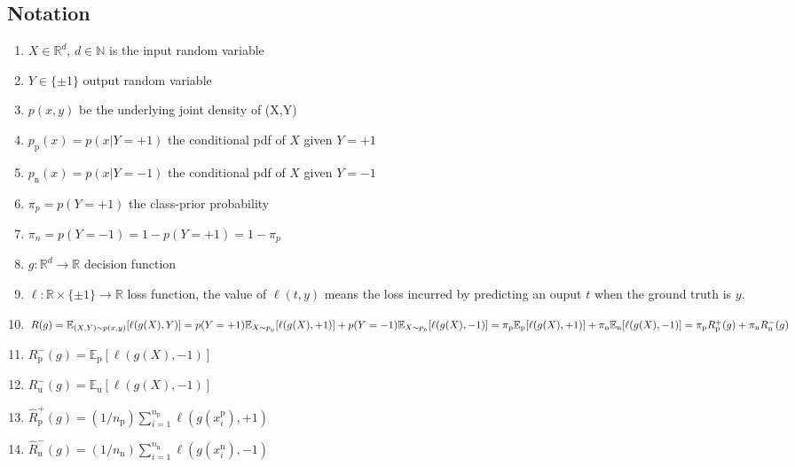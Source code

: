 \documentclass[12pt]{article}
\theoremstyle{definition}
\begin{document}
\subsection{Notation}
 \begin{enumerate}
	\item $X \in \mathbb{R}^{d}$, $d\in \mathbb{N}$ is the input random variable
	\item $ Y \in \{\pm 1\}$ output random variable
	\item $p(x,y)$ be the underlying joint density of (X,Y)
	\item $p_{\mathrm{p}}(x)=p(x | Y=+1)$ the conditional pdf of $X$ given $Y = +1$ 
	\item $p_{\mathrm{n}}(x)=p(x | Y=-1)$ the conditional pdf of $X$ given $Y = -1$ 
	\item $\pi_p = p(Y = +1)$ the class-prior probability
	\item $\pi_n = p(Y = -1) = 1 - p(Y = +1) = 1-\pi_p$
	\item $g: \mathbb{R}^{d} \rightarrow \mathbb{R}$ decision function
	\item $\ell: \mathbb{R} \times\{\pm 1\} \rightarrow \mathbb{R}$ loss function, the value of $\ell (t,y)$ means the loss incurred by predicting an ouput $t$ when the ground truth is $y$.
	\item $R(g)=\mathbb{E}_{(X, Y) \sim p(x, y)}[\ell(g(X), Y)]\\
	= p(Y = +1) \mathbb{E}_{X \sim p_{\mathrm{p}}}[\ell (g(X), +1)] + 
	p(Y = -1) \mathbb{E}_{X \sim p_{\mathrm{n}}}[\ell (g(X), -1)]\\
	=\pi_{\mathrm{p}}\mathbb{E}_{\mathrm{p}}[\ell (g(X), +1)] + \pi_{\mathrm{n}}\mathbb{E}_{\mathrm{n}}[\ell (g(X), -1)]\\=
	\pi_{\mathrm{p}} R_{\mathrm{p}}^{+}(g)+\pi_{\mathrm{n}} R_{\mathrm{n}}^{-}(g)$
	
		\item $R_{\mathrm{p}}^{-}(g)=\mathbb{E}_{\mathrm{p}}[\ell(g(X),-1)]
	$
	
	\item $R_{\mathrm{u}}^{-}(g)=\mathbb{E}_{\mathrm{u}}[\ell(g(X),-1)]$
	\item $\widehat{R}_{\mathrm{p}}^{+}(g) = \left(1 / n_{\mathrm{p}}\right) \sum_{i=1}^{n_{\mathrm{p}}} \ell\left(g\left(x_{i}^{\mathrm{p}}\right),+1\right)$ 
	
	
		\item  $\widehat{R}_{\mathrm{n}}^{-}(g)=\left(1 / n_{\mathrm{n}}\right) \sum_{i=1}^{n_{\mathrm{n}}} \ell\left(g\left(x_{i}^{\mathrm{n}}\right),-1\right)$
		

\end{enumerate}
\end{document}
